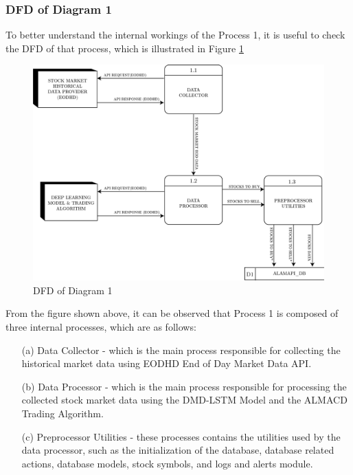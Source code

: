 \subsubsection{DFD of Diagram 1}
\label{subsubsec:dfd1}
To better understand the internal workings of the Process 1, 
it is useful to check the DFD of that process, which is illustrated in Figure \ref{fig:dfd1}
\begin{figure}[ht]
    \centering
    \includegraphics[width=1\textwidth]{./assets/Chapter_3/DFD/DFD_1.png}
    \caption{DFD of Diagram 1}
    \label{fig:dfd1}
\end{figure}
\FloatBarrier

From the figure shown above, it can be observed that Process 1 
is composed of three internal processes, which are as follows:
\begin{itemize}
    \item[(a)] Data Collector - which is the main process responsible 
    for collecting the historical market data using EODHD End of Day Market Data API.
    \item[(b)] Data Processor - which is the main process responsible for processing the collected 
    stock market data using the DMD-LSTM Model and the ALMACD Trading Algorithm.
    \item[(c)] Preprocessor Utilities - these processes contains the utilities used by the
    data processor, such as the initialization of the database, database related actions, 
    database models, stock symbols, and logs and alerts module.
\end{itemize}

